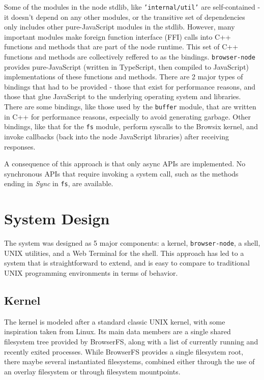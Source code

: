 \documentclass{acm_proc_article-sp}
\begin{document}
Some of the modules in the node stdlib, like \texttt{'internal/util'}
are self-contained - it doesn't depend on any other modules, or the
transitive set of dependencies only includes other pure-JavaScript
modules in the stdlib.  However, many important modules make foreign
function interface (FFI) calls into C++ functions and methods that are
part of the node runtime.  This set of C++ functions and methods are
collectively reffered to as the bindings.  \texttt{browser-node}
provides pure-JavaScript (written in TypeScript, then compiled to
JavaScript) implementations of these functions and methods.  There are
2 major types of bindings that had to be provided - those that exist
for performance reasons, and those that glue JavaScript to the
underlying operating system and libraries.  There are some bindings,
like those used by the \texttt{buffer} module, that are written in C++
for performance reasons, especially to avoid generating garbage.
Other bindings, like that for the \texttt{fs} module, perform syscalls
to the Browsix kernel, and invoke callbacks (back into the node
JavaScript libraries) after receiving responses.

A consequence of this approach is that only async APIs are
implemented.  No synchronous APIs that require invoking a system call,
such as the methods ending in \emph{Sync} in \texttt{fs}, are
available.

\section{System Design}

The system was designed as 5 major components: a kernel,
\texttt{browser-node}, a shell, UNIX utilities, and a Web Terminal for
the shell.  This approach has led to a system that is straightforward
to extend, and is easy to compare to traditional UNIX programming
environments in terms of behavior.

\subsection{Kernel}

The kernel is modeled after a standard classic UNIX kernel, with some
inspiration taken from Linux.  Its main data members are a single
shared filesystem tree provided by BrowserFS, along with a list of
currently running and recently exited processes.  While BrowserFS
provides a single filesystem root, there maybe several instantiated
filesystems, combined either through the use of an overlay filesystem
or through filesystem mountpoints.
\end{document}
